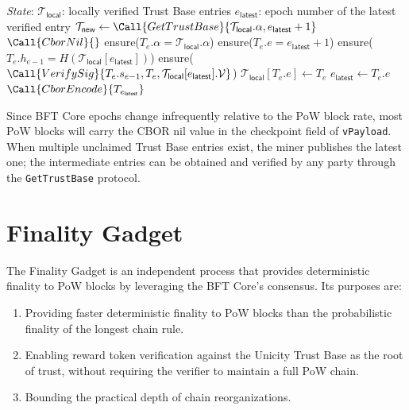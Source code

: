 \begin{algorithm}[!htbp]
  \caption{Snapshot Generation by a PoW Miner}\label{alg:snapshot-publish}
  \begin{algorithmic}[0]
    \State \emph{State}:
    \State $\mathcal{T}_\mathsf{local}$: locally verified Trust Base entries
    \State $e_\mathsf{latest}$: epoch number of the latest verified entry
    \State
      \State {}
      \State $\mathcal{T}_\mathsf{new} \gets \Call{GetTrustBase}{\mathcal{T}_\mathsf{local}.\alpha, e_\mathsf{latest}+1}$
        \State \Return $\Call{CborNil}{}$ 
      \EndIf
      \State
      \State {}
        \State ensure($T_e.\alpha = \mathcal{T}_\mathsf{local}.\alpha$) 
        \State ensure($T_e.e = e_\mathsf{latest} + 1$) 
        \State ensure($T_e.h_{e-1} = H(\mathcal{T}_\mathsf{local}[e_\mathsf{latest}])$) 
        \State ensure($\Call{VerifySig}{T_e.s_{e-1}, T_e, \mathcal{T}_\mathsf{local}[e_\mathsf{latest}].\mathcal{V}}$)
        \State $\mathcal{T}_\mathsf{local}[T_e.e] \gets T_e$
        \State $e_\mathsf{latest} \gets T_e.e$
      \EndFor
      \State
      \State \Return $\Call{CborEncode}{T_{e_\mathsf{latest}}}$ 
    \EndFunction
  \end{algorithmic}
\end{algorithm}

Since BFT Core epochs change infrequently relative to the PoW block rate, most PoW blocks will carry the CBOR nil value in the checkpoint field of \texttt{vPayload}. When multiple unclaimed Trust Base entries exist, the miner publishes the latest one; the intermediate entries can be obtained and verified by any party through the \texttt{GetTrustBase} protocol.


\section{Finality Gadget}\label{sec:finality-gadget}

The Finality Gadget is an independent process that provides deterministic finality to PoW blocks by leveraging the BFT Core's consensus. Its purposes are:
\begin{enumerate}[nosep]
  \item Providing faster deterministic finality to PoW blocks than the probabilistic finality of the longest chain rule.
  \item Enabling reward token verification against the Unicity Trust Base as the root of trust, without requiring the verifier to maintain a full PoW chain.
  \item Bounding the practical depth of chain reorganizations.
\end{enumerate}


